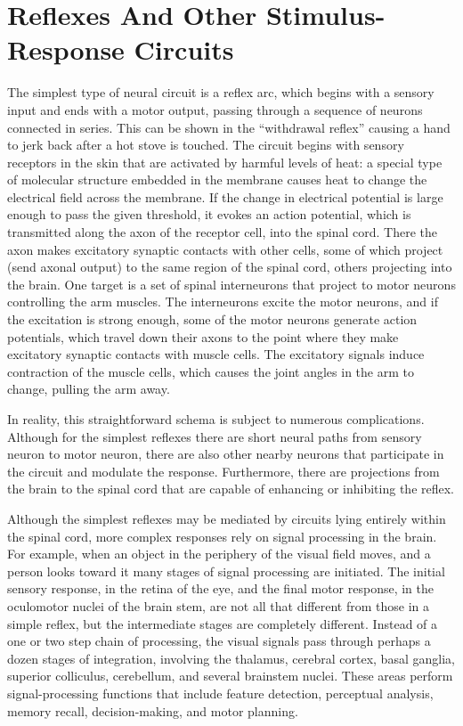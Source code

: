 \hypertarget{reflexes-and-other-stimulus-response-circuits}{%
\section{Reflexes And Other Stimulus-Response Circuits}\label{reflexes-and-other-stimulus-response-circuits}}

The simplest type of neural circuit is a reflex arc, which begins with a sensory input and ends with a motor output, passing through a sequence of neurons connected in series. This can be shown in the ``withdrawal reflex'' causing a hand to jerk back after a hot stove is touched. The circuit begins with sensory receptors in the skin that are activated by harmful levels of heat: a special type of molecular structure embedded in the membrane causes heat to change the electrical field across the membrane. If the change in electrical potential is large enough to pass the given threshold, it evokes an action potential, which is transmitted along the axon of the receptor cell, into the spinal cord. There the axon makes excitatory synaptic contacts with other cells, some of which project (send axonal output) to the same region of the spinal cord, others projecting into the brain. One target is a set of spinal interneurons that project to motor neurons controlling the arm muscles. The interneurons excite the motor neurons, and if the excitation is strong enough, some of the motor neurons generate action potentials, which travel down their axons to the point where they make excitatory synaptic contacts with muscle cells. The excitatory signals induce contraction of the muscle cells, which causes the joint angles in the arm to change, pulling the arm away.

In reality, this straightforward schema is subject to numerous complications. Although for the simplest reflexes there are short neural paths from sensory neuron to motor neuron, there are also other nearby neurons that participate in the circuit and modulate the response. Furthermore, there are projections from the brain to the spinal cord that are capable of enhancing or inhibiting the reflex.

Although the simplest reflexes may be mediated by circuits lying entirely within the spinal cord, more complex responses rely on signal processing in the brain. For example, when an object in the periphery of the visual field moves, and a person looks toward it many stages of signal processing are initiated. The initial sensory response, in the retina of the eye, and the final motor response, in the oculomotor nuclei of the brain stem, are not all that different from those in a simple reflex, but the intermediate stages are completely different. Instead of a one or two step chain of processing, the visual signals pass through perhaps a dozen stages of integration, involving the thalamus, cerebral cortex, basal ganglia, superior colliculus, cerebellum, and several brainstem nuclei. These areas perform signal-processing functions that include feature detection, perceptual analysis, memory recall, decision-making, and motor planning.

